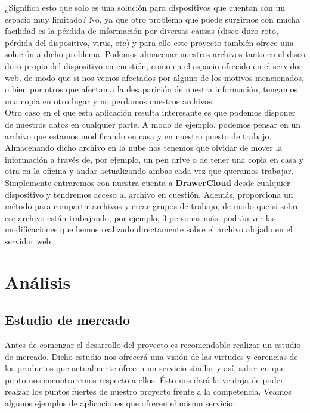¿Significa esto que solo es una solución para dispositivos que cuentan con un espacio muy limitado? No, ya que otro problema que puede surgirnos con mucha facilidad es la pérdida de información por diversas causas (disco duro roto, pérdida del dispositivo, virus, etc) y para ello este proyecto también ofrece una solución a dicho problema. Podemos almacenar nuestros archivos tanto en el disco duro propio del dispositivo en cuestión, como en el espacio ofrecido en el servidor web, de modo que si nos vemos afectados por alguno de los motivos mencionados, o bien por otros que afectan a la desaparición de nuestra información, tengamos una copia en otro lugar y no perdamos nuestros archivos. \\

Otro caso en el que esta aplicación resulta interesante es que podemos disponer de nuestros datos en cualquier parte. A modo de ejemplo, podemos pensar en un archivo que estamos modificando en casa y en nuestro puesto de trabajo. Almacenando dicho archivo en la nube nos tenemos que olvidar de mover la información a través de, por ejemplo, un pen drive o de tener una copia en casa y otra en la oficina y andar actualizando ambas cada vez que queramos trabajar. Simplemente entraremos con nuestra cuenta a \textbf{DrawerCloud} desde cualquier dispositivo y tendremos acceso al archivo en cuestión. Además, proporciona un método para compartir archivos y crear grupos de trabajo, de modo que si sobre ese archivo están trabajando, por ejemplo, 3 personas más, podrán ver las modificaciones que hemos realizado directamente sobre el archivo alojado en el servidor web.

\newpage
\section{Análisis}
\subsection{Estudio de mercado}
Antes de comenzar el desarrollo del proyecto es recomendable realizar un estudio de mercado. Dicho estudio nos ofrecerá una visión de las virtudes y carencias de los productos que actualmente ofrecen un servicio similar y así, saber en que punto nos encontraremos respecto a ellos. Ésto nos dará la ventaja de poder realzar los puntos fuertes de nuestro proyecto frente a la competencia. Veamos algunos ejemplos de aplicaciones que ofrecen el mismo servicio: \\

